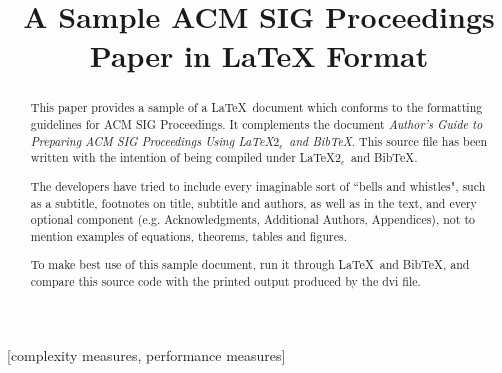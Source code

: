 \documentclass{acm_proc_article-sp-sigmod09}
\begin{document}
%

\title{A Sample {\ttlit ACM} SIG Proceedings Paper in LaTeX
Format}
%

%
\maketitle
\begin{abstract}
This paper provides a sample of a \LaTeX\ document which conforms to
the formatting guidelines for ACM SIG Proceedings.
It complements the document \textit{Author's Guide to Preparing
ACM SIG Proceedings Using \LaTeX$2_\epsilon$\ and Bib\TeX}. This
source file has been written with the intention of being
compiled under \LaTeX$2_\epsilon$\ and BibTeX.

The developers have tried to include every imaginable sort
of ``bells and whistles", such as a subtitle, footnotes on
title, subtitle and authors, as well as in the text, and
every optional component (e.g. Acknowledgments, Additional
Authors, Appendices), not to mention examples of
equations, theorems, tables and figures.

To make best use of this sample document, run it through \LaTeX\
and BibTeX, and compare this source code with the printed
output produced by the dvi file.
\end{abstract}

[complexity measures, performance measures]


\end{document}
